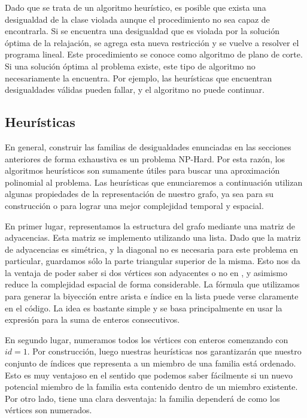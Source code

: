 Dado que se trata de un algoritmo heurístico, es posible que exista una desigualdad de la clase violada aunque el procedimiento no sea capaz de encontrarla. Si se encuentra una desigualdad que es violada por la solución óptima de la relajación, se agrega esta nueva restricción y se vuelve a resolver el programa lineal. Este procedimiento se conoce como algoritmo de plano de corte. Si una solución óptima al problema existe, este tipo de algoritmo no necesariamente la encuentra. Por ejemplo, las heurísticas que encuentran desigualdades válidas pueden fallar, y el algoritmo no puede continuar.

\subsection{Heurísticas}

En general, construir las familias de desigualdades enunciadas en las secciones anteriores de forma exhaustiva es un problema NP-Hard. Por esta razón, los algoritmos heurísticos son sumamente útiles para buscar una aproximación polinomial al problema. Las heurísticas que enunciaremos a continuación utilizan algunas propiedades de la representación de nuestro grafo, ya sea para su construcción o para lograr una mejor complejidad temporal y espacial.

En primer lugar, representamos la estructura del grafo mediante una matriz de adyacencias. Esta matriz se implemento utilizando una lista. Dado que la matriz de adyacencias es simétrica, y la diagonal no es necesaria para este problema en particular, guardamos sólo la parte triangular superior de la misma. Esto nos da la ventaja de poder saber si dos vértices son adyacentes o no en , y asimismo reduce la complejidad espacial de forma considerable. La fórmula que utilizamos para generar la biyección entre arista e índice en la lista puede verse claramente en el código. La idea es bastante simple y se basa principalmente en usar la expresión para la suma de enteros consecutivos.

En segundo lugar, numeramos todos los vértices con enteros comenzando con $id = 1$. Por construcción, luego nuestras heurísticas nos garantizarán que nuestro conjunto de índices que representa a un miembro de una familia está ordenado. Esto es muy ventajoso en el sentido que podemos saber fácilmente si un nuevo potencial miembro de la familia esta contenido dentro de un miembro existente. Por otro lado, tiene una clara desventaja: la familia dependerá de como los vértices son numerados.


